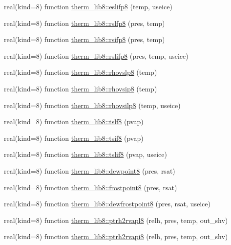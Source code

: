 \begin{DoxyCompactItemize}
real(kind=8) function \hyperlink{namespacetherm__lib8_ae0d53f4e0871d19461d34b59cc932516}{therm\+\_\+lib8\+::eslifp8} (temp, useice)
\item 
real(kind=8) function \hyperlink{namespacetherm__lib8_a73403657254241b151da2ab205ab477f}{therm\+\_\+lib8\+::rslfp8} (pres, temp)
\item 
real(kind=8) function \hyperlink{namespacetherm__lib8_ad59e6dc4fe8995e92cdae7dd3a340efc}{therm\+\_\+lib8\+::rsifp8} (pres, temp)
\item 
real(kind=8) function \hyperlink{namespacetherm__lib8_ab015aacbfd2ec939e27197d7477f09a7}{therm\+\_\+lib8\+::rslifp8} (pres, temp, useice)
\item 
real(kind=8) function \hyperlink{namespacetherm__lib8_a8f1e9b7f94a457d1972dc10825caefe3}{therm\+\_\+lib8\+::rhovslp8} (temp)
\item 
real(kind=8) function \hyperlink{namespacetherm__lib8_a9ad0dba1a5ff870a6a36cd06835e8e15}{therm\+\_\+lib8\+::rhovsip8} (temp)
\item 
real(kind=8) function \hyperlink{namespacetherm__lib8_a3700047f1dd386e992cb13e626018656}{therm\+\_\+lib8\+::rhovsilp8} (temp, useice)
\item 
real(kind=8) function \hyperlink{namespacetherm__lib8_ad5b9924474672841007e9b1542a87b4e}{therm\+\_\+lib8\+::tslf8} (pvap)
\item 
real(kind=8) function \hyperlink{namespacetherm__lib8_a80b5a2ebc2ce135a214004173c06cb4e}{therm\+\_\+lib8\+::tsif8} (pvap)
\item 
real(kind=8) function \hyperlink{namespacetherm__lib8_ada59a10b18f64fb7eba657201813da06}{therm\+\_\+lib8\+::tslif8} (pvap, useice)
\item 
real(kind=8) function \hyperlink{namespacetherm__lib8_a0d84f87a60357ce93e4c39dde6795068}{therm\+\_\+lib8\+::dewpoint8} (pres, rsat)
\item 
real(kind=8) function \hyperlink{namespacetherm__lib8_a137ef754961bd0772247f311c22e160f}{therm\+\_\+lib8\+::frostpoint8} (pres, rsat)
\item 
real(kind=8) function \hyperlink{namespacetherm__lib8_a028fa9eb09650fbaa2b7c0b6b8a2fd8c}{therm\+\_\+lib8\+::dewfrostpoint8} (pres, rsat, useice)
\item 
real(kind=8) function \hyperlink{namespacetherm__lib8_a1369aae8fe00b751c008902b167f212b}{therm\+\_\+lib8\+::ptrh2rvapl8} (relh, pres, temp, out\+\_\+shv)
\item 
real(kind=8) function \hyperlink{namespacetherm__lib8_a7cf8c625372462c063600af8050c6639}{therm\+\_\+lib8\+::ptrh2rvapi8} (relh, pres, temp, out\+\_\+shv)

\end{DoxyCompactItemize}
